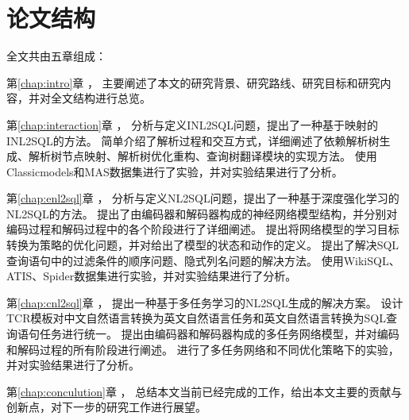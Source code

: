 \section{论文结构}
\label{intro:structure}
全文共由五章组成：

第\ref{chap:intro}章  ， 
主要阐述了本文的研究背景、研究路线、研究目标和研究内容，并对全文结构进行总览。

第\ref{chap:interaction}章  ，
分析与定义INL2SQL问题，提出了一种基于映射的INL2SQL的方法。
简单介绍了解析过程和交互方式，详细阐述了依赖解析树生成、解析树节点映射、解析树优化重构、查询树翻译模块的实现方法。
使用Classicmodels和MAS数据集进行了实验，并对实验结果进行了分析。

第\ref{chap:enl2sql}章  ，
分析与定义NL2SQL问题，提出了一种基于深度强化学习的NL2SQL的方法。
提出了由编码器和解码器构成的神经网络模型结构，并分别对编码过程和解码过程中的各个阶段进行了详细阐述。
提出将网络模型的学习目标转换为策略的优化问题，并对给出了模型的状态和动作的定义。
提出了解决SQL查询语句中的过滤条件的顺序问题、隐式列名问题的解决方法。
使用WikiSQL、ATIS、Spider数据集进行实验，并对实验结果进行了分析。


第\ref{chap:cnl2sql}章  ，
提出一种基于多任务学习的NL2SQL生成的解决方案。
设计TCR模板对中文自然语言转换为英文自然语言任务和英文自然语言转换为SQL查询语句任务进行统一。
提出由编码器和解码器构成的多任务网络模型，并对编码和解码过程的所有阶段进行阐述。
进行了多任务网络和不同优化策略下的实验，并对实验结果进行了分析。


第\ref{chap:conculution}章  ，
总结本文当前已经完成的工作，给出本文主要的贡献与创新点，对下一步的研究工作进行展望。